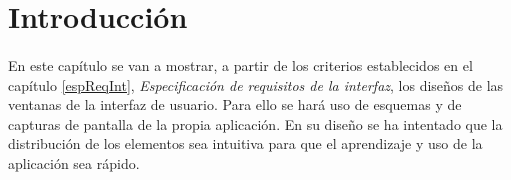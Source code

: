 \section{Introducción}

  \paragraph{}En este capítulo se van a mostrar, a partir de los criterios
  establecidos en el capítulo \ref{espReqInt},
  \textit{Especificación de requisitos de la interfaz}, los diseños de las
  ventanas de la interfaz de usuario. Para ello se hará uso de esquemas y de
  capturas de pantalla de la propia aplicación. En su diseño se ha intentado que
  la distribución de los elementos sea intuitiva para que el aprendizaje y uso
  de la aplicación sea rápido.

